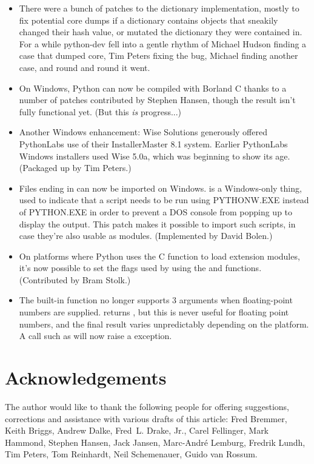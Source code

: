 \documentclass{howto}
\begin{document}
\begin{itemize}
  \item There were a bunch of patches to the dictionary
  implementation, mostly to fix potential core dumps if a dictionary
  contains objects that sneakily changed their hash value, or mutated
  the dictionary they were contained in. For a while python-dev fell
  into a gentle rhythm of Michael Hudson finding a case that dumped
  core, Tim Peters fixing the bug, Michael finding another case, and round
  and round it went.   

  \item On Windows, Python can now be compiled with Borland C thanks
  to a number of patches contributed by Stephen Hansen, though the
  result isn't fully functional yet.  (But this \emph{is} progress...)
  
  \item Another Windows enhancement: Wise Solutions generously offered
  PythonLabs use of their InstallerMaster 8.1 system.  Earlier
  PythonLabs Windows installers used Wise 5.0a, which was beginning to
  show its age.  (Packaged up by Tim Peters.)

  \item Files ending in  can now be imported on Windows.
   is a Windows-only thing, used to indicate that a script
  needs to be run using PYTHONW.EXE instead of PYTHON.EXE in order to
  prevent a DOS console from popping up to display the output.  This
  patch makes it possible to import such scripts, in case they're also
  usable as modules.  (Implemented by David Bolen.)

  \item On platforms where Python uses the C  function 
  to load extension modules, it's now possible to set the flags used 
  by  using the  and
   functions.    (Contributed by Bram Stolk.)

  \item The  built-in function no longer supports 3
  arguments when floating-point numbers are supplied.
   returns , but
  this is never useful for floating point numbers, and the final
  result varies unpredictably depending on the platform.  A call such
  as  will now raise a 
  exception.
  
\end{itemize}


\section{Acknowledgements}

The author would like to thank the following people for offering
suggestions, corrections and assistance with various drafts of this
article: Fred Bremmer, Keith Briggs, Andrew Dalke, Fred~L. Drake, Jr.,
Carel Fellinger, Mark Hammond, Stephen Hansen, Jack Jansen,
Marc-Andr\'e Lemburg, Fredrik Lundh, Tim Peters, Tom Reinhardt, Neil
Schemenauer, Guido van Rossum.
\end{document}
